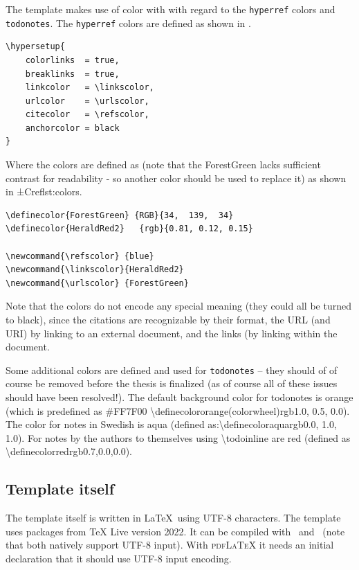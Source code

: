 The template makes use of color with with regard to the \texttt{hyperref} colors and \texttt{todonotes}. The \texttt{hyperref} colors are defined as shown in .
\begin{lstlisting}[language={[LaTeX]TeX}, caption={\textbackslash hypersetup}, label=lst:setupHyperRef]
\hypersetup{
	colorlinks  = true,
	breaklinks  = true,
	linkcolor   = \linkscolor,
	urlcolor    = \urlscolor,
	citecolor   = \refscolor,
	anchorcolor = black
}
\end{lstlisting}
Where the colors are defined as (note that the ForestGreen lacks sufficient contrast for readability - so another color should be used to replace it) as shown in ±Cref{lst:colors}.
\begin{lstlisting}[language={[LaTeX]TeX}, caption={Some colors for hyper references }, label=lst:colors]
\definecolor{ForestGreen} {RGB}{34,  139,  34}
\definecolor{HeraldRed2}   {rgb}{0.81, 0.12, 0.15}

\newcommand{\refscolor} {blue}
\newcommand{\linkscolor}{HeraldRed2}
\newcommand{\urlscolor} {ForestGreen}
\end{lstlisting}

Note that the colors do not encode any special meaning (\ie they could all be turned to black), since the citations are recognizable by their format, the URL (and URI) by linking to an external document, and the links (by linking within the document.

Some additional colors are defined and used for \texttt{todonotes} – they should of of course be removed before the thesis is finalized (as of course all of these issues should have been resolved!). The default background color for todonotes is orange (which is predefined as \#FF7F00 \textbackslash definecolor{orange(colorwheel)}{rgb}{1.0, 0.5, 0.0}). The color for notes in Swedish is aqua (defined as:\textbackslash definecolor{aqua}{rgb}{0.0, 1.0, 1.0}). For notes by the authors to themselves using \textbackslash todoinline are red (defined as \textbackslash definecolor{red}{rgb}{0.7,0.0,0.0}). 

\subsection{Template itself}
\label{sec:ccessibilityOfTemplateItself}
The template itself is written in \LaTeX~using UTF-8 characters. The template uses packages from TeX Live version 2022. It can be compiled with \XeLaTeX\ and \LuaLaTeX\  (note that both natively support UTF-8 input). With \textsc{pdfLaTeX} it needs an initial declaration that it should use UTF-8 input encoding.

